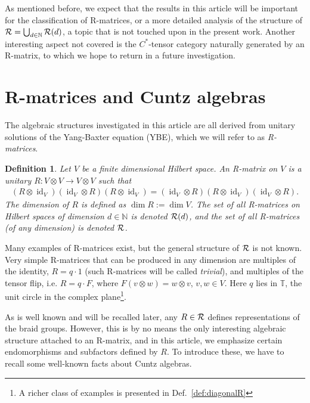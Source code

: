 \documentclass[12pt,a4paper]{amsart}
\numberwithin{equation}{section}
\newtheorem{definition}[theorem]{Definition}
\theoremstyle{remark}
\def\dim{\operatorname{dim}}
\def\id{\operatorname{id}}
\def\id{\operatorname{id}}
\newcommand{\ot}{\otimes}
\newcommand{\Nl}{\mathbb{N}}
\def\T{\mathbb{T}}
\begin{document}
As mentioned before, we expect that the results in this article will be important for the classification of R-matrices, or a more detailed analysis of the structure of $\CR=\bigcup_{d\in\Nl}\CR(d)$, a topic that is not touched upon in the present work. Another interesting aspect not covered is the $C^*$-tensor category naturally generated by an R-matrix, to which we hope to return in a future investigation.





\section{R-matrices and Cuntz algebras}\label{section:RandCuntz}

The algebraic structures investigated in this article are all derived from unitary solutions of the Yang-Baxter equation (YBE), which we will refer to as {\em R-matrices}. 

\begin{definition}\label{def:R}
    Let $V$ be a finite dimensional Hilbert space. An {\em R-matrix on $V$} is a unitary $R:V\ot V\to V\ot V$ such that
    \begin{align}\label{eq:YBE}
        (R\ot\id_V)(\id_V\ot R)(R\ot \id_V)=(\id_V\ot R)(R\ot \id_V)(\id_V\ot R).
    \end{align}
    The {\em dimension of $R$} is defined as $\dim R:=\dim V$. The set of all R-matrices on Hilbert spaces of dimension $d\in\Nl$ is denoted $\mathcal{R}(d)$, and the set of all R-matrices (of any dimension) is denoted $\mathcal{R}$.
\end{definition}
Many examples of R-matrices exist, but the general structure of $\mathcal{R}$ is not known. Very simple R-matrices that can be produced in any dimension are multiples of the identity, $R=q\cdot1$ (such R-matrices will be called {\em trivial}), and multiples of the tensor flip, i.e. $R=q\cdot F$, where $F(v\ot w)=w\ot v$, $v,w\in V$. Here $q$ lies in $\T$, the unit circle in the complex plane\footnote{A richer class of examples is presented in Def.~\ref{def:diagonalR}}.

As is well known and will be recalled later, any $R\in\mathcal{R}$ defines representations of the braid groups. However, this is by no means the only interesting algebraic structure attached to an R-matrix, and in this article, we emphasize certain endomorphisms and subfactors defined by $R$. To introduce these, we have to recall some well-known facts about Cuntz algebras.
\end{document}
